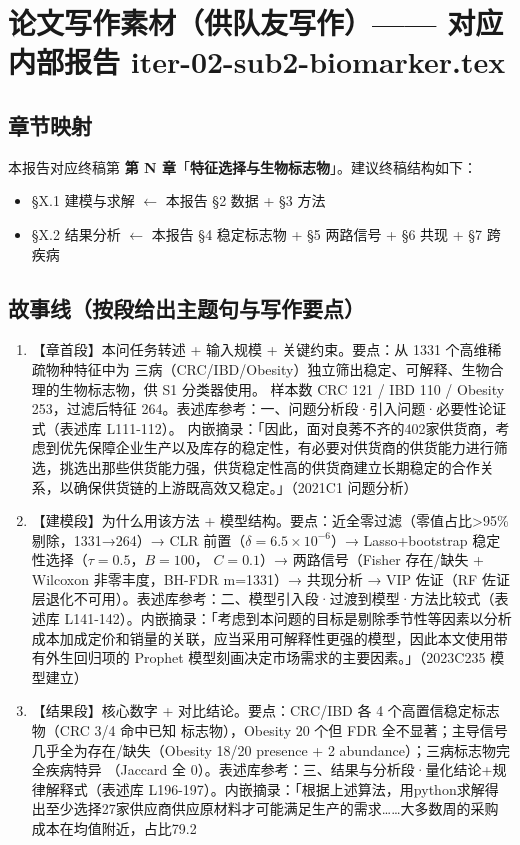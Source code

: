 \documentclass{article}   %
\begin{document}
\section{论文写作素材（供队友写作）—— 对应内部报告 iter-02-sub2-biomarker.tex}

\subsection{章节映射}

本报告对应终稿第 \textbf{第 N 章}「\textbf{特征选择与生物标志物}」。建议终稿结构如下：
\begin{itemize}
  \item §X.1 建模与求解 \quad $\leftarrow$ 本报告 §2 数据 + §3 方法
  \item §X.2 结果分析 \quad $\leftarrow$ 本报告 §4 稳定标志物 + §5 两路信号 + §6 共现 + §7 跨疾病
\end{itemize}

\subsection{故事线（按段给出主题句与写作要点）}

\begin{enumerate}
  \item 【章首段】本问任务转述 + 输入规模 + 关键约束。要点：从 1331 个高维稀疏物种特征中为
        三病（CRC/IBD/Obesity）独立筛出稳定、可解释、生物合理的生物标志物，供 S1 分类器使用。
        样本数 CRC 121 / IBD 110 / Obesity 253，过滤后特征 264。表述库参考：一、问题分析段·引入问题·必要性论证式（表述库 L111-112）。
  内嵌摘录：「因此，面对良莠不齐的402家供货商，考虑到优先保障企业生产以及库存的稳定性，有必要对供货商的供货能力进行筛选，挑选出那些供货能力强，供货稳定性高的供货商建立长期稳定的合作关系，以确保供货链的上游既高效又稳定。」（2021C1 问题分析）
  \item 【建模段】为什么用该方法 + 模型结构。要点：近全零过滤（零值占比>95\% 剔除，1331→264）→
        CLR 前置（$\delta=6.5\times10^{-6}$）→ Lasso+bootstrap 稳定性选择（$\tau=0.5$，$B=100$，
        $C=0.1$）→ 两路信号（Fisher 存在/缺失 + Wilcoxon 非零丰度，BH-FDR m=1331）→ 共现分析 →
        VIP 佐证（RF 佐证层退化不可用）。表述库参考：二、模型引入段·过渡到模型·方法比较式（表述库 L141-142）。内嵌摘录：「考虑到本问题的目标是剔除季节性等因素以分析成本加成定价和销量的关联，应当采用可解释性更强的模型，因此本文使用带有外生回归项的 Prophet 模型刻画决定市场需求的主要因素。」（2023C235 模型建立）
  \item 【结果段】核心数字 + 对比结论。要点：CRC/IBD 各 4 个高置信稳定标志物（CRC 3/4 命中已知
        标志物），Obesity 20 个但 FDR 全不显著；主导信号几乎全为存在/缺失（Obesity 18/20
        presence + 2 abundance）；三病标志物完全疾病特异
        （Jaccard 全 0）。表述库参考：三、结果与分析段·量化结论+规律解释式（表述库 L196-197）。内嵌摘录：「根据上述算法，用python求解得出至少选择27家供应商供应原材料才可能满足生产的需求……大多数周的采购成本在均值附近，占比79.2%
\end{enumerate}
\end{document}
